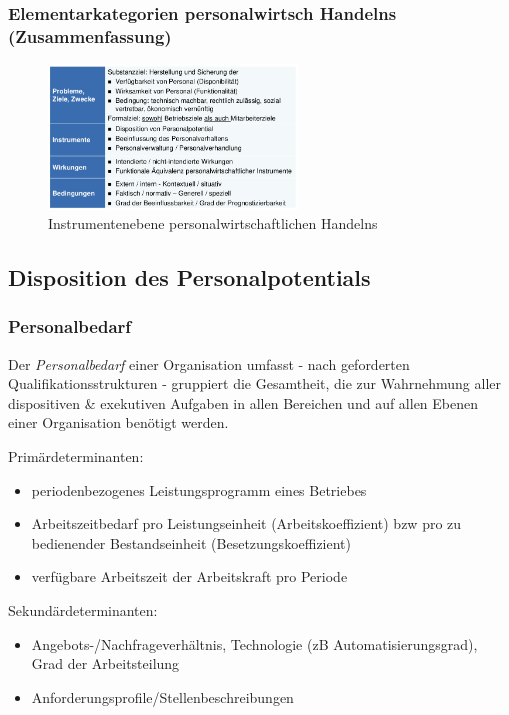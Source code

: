 \documentclass[11pt]{article}
\begin{document}
\subsubsection{Elementarkategorien personalwirtsch Handelns (Zusammenfassung)}
\label{sec:org0c278bc}
\begin{figure}[htbp]
\centering
\includegraphics[width=250px]{./pictures/perskateg.png}
\caption{Instrumentenebene personalwirtschaftlichen Handelns}
\end{figure} 

\subsection{Disposition des Personalpotentials}
\label{sec:org1bb50b3}
\subsubsection{Personalbedarf}
\label{sec:org6c99c0e}
Der \emph{Personalbedarf} einer Organisation umfasst - nach geforderten Qualifikationsstrukturen - gruppiert die Gesamtheit, die zur Wahrnehmung aller dispositiven \& exekutiven Aufgaben in allen Bereichen und auf allen Ebenen einer Organisation benötigt werden.

Primärdeterminanten:
\begin{itemize}
\item periodenbezogenes Leistungsprogramm eines Betriebes
\item Arbeitszeitbedarf pro Leistungseinheit (Arbeitskoeffizient) bzw pro zu bedienender Bestandseinheit (Besetzungskoeffizient)
\item verfügbare Arbeitszeit der Arbeitskraft pro Periode
\end{itemize}

Sekundärdeterminanten:
\begin{itemize}
\item Angebots-/Nachfrageverhältnis, Technologie (zB Automatisierungsgrad), Grad der Arbeitsteilung
\item Anforderungsprofile/Stellenbeschreibungen
\end{itemize}
\end{document}
